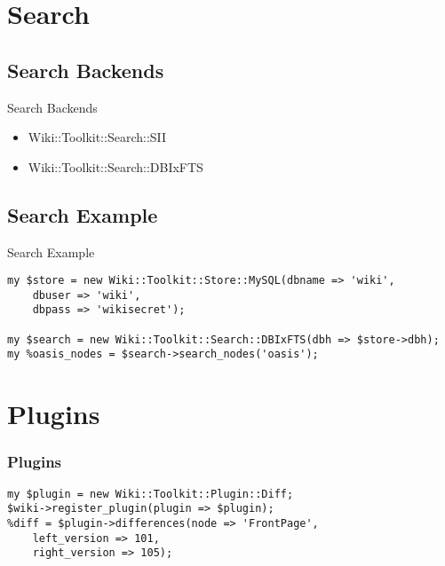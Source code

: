\section{Search}

\subsection{Search Backends}


\begin{frame}{Search Backends}
 \begin{itemize}
  \item Wiki::Toolkit::Search::SII
  \item Wiki::Toolkit::Search::DBIxFTS
 \end{itemize}
\end{frame}
\subsection{Search Example}


\begin{frame}[fragile]{Search Example}
\begin{lstlisting}
my $store = new Wiki::Toolkit::Store::MySQL(dbname => 'wiki',
    dbuser => 'wiki',
    dbpass => 'wikisecret');

my $search = new Wiki::Toolkit::Search::DBIxFTS(dbh => $store->dbh);
my %oasis_nodes = $search->search_nodes('oasis');
\end{lstlisting}
\end{frame}

\section{Plugins}


\begin{frame}[fragile]
\frametitle{Plugins}
\begin{lstlisting}
my $plugin = new Wiki::Toolkit::Plugin::Diff;
$wiki->register_plugin(plugin => $plugin);
%diff = $plugin->differences(node => 'FrontPage',
    left_version => 101,
    right_version => 105);
\end{lstlisting}
\end{frame}


